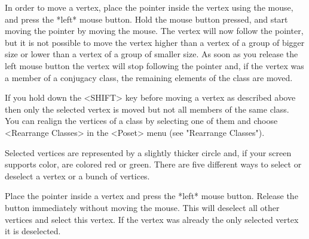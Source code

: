 





In order to move a vertex, place the  pointer inside the vertex using the
mouse, and press the *left* mouse button.  Hold the mouse button pressed,
and start moving  the pointer by moving  the mouse.  The  vertex will now
follow the pointer, but it is not possible to move the vertex higher than
a vertex  of a group of bigger size  
or lower than a vertex of a group of smaller
size.
As soon as you release the left mouse
button the vertex will stop following the pointer  and, if the vertex was
a member of a  conjugacy class, the remaining elements  of the class  are
moved.

If you hold  down  the <SHIFT> key before  moving  a vertex as  described
above then  only the selected vertex is moved but not all members of the
same class. You can realign the vertices of a class by selecting one of
them and choose <Rearrange Classes> in the <Poset> menu 
(see "Rearrange Classes").


Selected vertices are  represented by a slightly  thicker circle and,  if
your screen  supports color, are colored red   or green.  There  are five
different ways to select or deselect a vertex or a bunch of vertices.

Place the  pointer inside  a  vertex and press   the *left* mouse button.
Release   the button immediately   without  moving the  mouse.  This will
deselect all other vertices  and select this vertex.   If the vertex  was
already the only selected vertex it is deselected.


